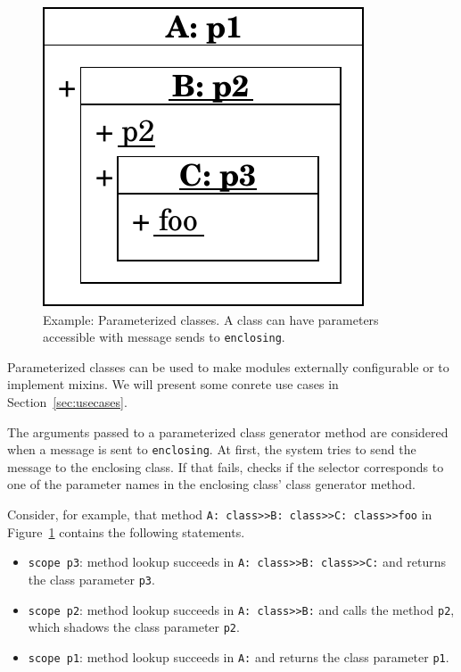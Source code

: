 \begin{figure}
	\includegraphics[scale=0.75]{nested_notation_params.pdf}
	\centering
	\caption[Example: Parameterized classes]{Example: Parameterized classes. A class can have parameters accessible with message sends to \texttt{enclosing}.}
	\label{fig:concept_param_classes}
\end{figure}

Parameterized classes can be used to make modules externally configurable or to implement mixins. We will present some conrete use cases in Section~\ref{sec:usecases}.

The arguments passed to a parameterized class generator method are considered when a message is sent to \texttt{enclosing}. At first, the system tries to send the message to the enclosing class. If that fails, \msname checks if the selector corresponds to one of the parameter names in the enclosing class' class generator method.

Consider, for example, that method \texttt{A: class>>B: class>>C: class>>foo} in Figure~\ref{fig:concept_param_classes} contains the following statements.
\begin{itemize}
	\item \texttt{scope p3}: method lookup succeeds in \texttt{A: class>>B: class>>C:} and returns the class parameter \texttt{p3}.
	\item \texttt{scope p2}: method lookup succeeds in \texttt{A: class>>B:} and calls the method \texttt{p2}, which shadows the class parameter \texttt{p2}.
	\item \texttt{scope p1}: method lookup succeeds in \texttt{A:} and returns the class parameter \texttt{p1}.
\end{itemize}
